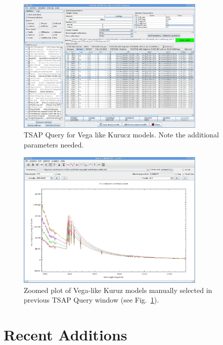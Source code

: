 \documentclass[final,authoryear,5p,times,twocolumn]{elsarticle}
\begin{document}
\begin{figure}[t]
\begin{center}
\includegraphics[width=0.8\textwidth]{TSSA-query.pdf}
\caption{TSAP Query for Vega like Kurucz models. Note the additional parameters needed.}
\label{fig:TSAP-query}
\end{center}
\end{figure}


\begin{figure}[t]
\begin{center}
\includegraphics[width=0.8\textwidth]{TSSA-plot.pdf}
\caption{Zoomed plot of Vega-like Kuruz models manually selected in previous
TSAP Query window (see Fig.~\ref{fig:TSAP-query}). }
\label{fig:TSAP-plot}
\end{center}
\end{figure}



\section{Recent Additions}
\end{document}
